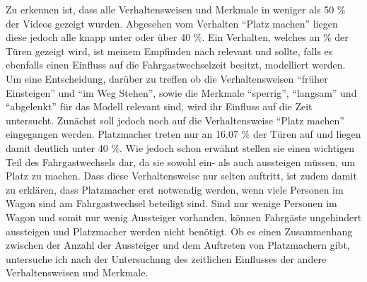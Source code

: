 Zu erkennen ist, dass alle Verhaltensweisen und Merkmale in weniger als 50 \% der Videos gezeigt wurden. Abgesehen vom Verhalten "`Platz machen"' liegen diese jedoch alle knapp unter oder über 40 \%. Ein Verhalten, welches an  \% der Türen gezeigt wird, ist meinem Empfinden nach relevant und sollte, falls es ebenfalls einen Einfluss auf die Fahrgastwechselzeit besitzt, modelliert werden. Um eine Entscheidung, darüber zu treffen ob die Verhaltensweisen "`früher Einsteigen"' und "`im Weg Stehen"', sowie die Merkmale "`sperrig"', "`langsam"' und "`abgelenkt"' für das Modell relevant sind, wird ihr Einfluss auf die Zeit untersucht. Zunächst soll jedoch noch auf die Verhaltensweise "`Platz machen"' eingegangen werden. Platzmacher treten nur an 16.07 \% der Türen auf und liegen damit deutlich unter 40 \%. Wie jedoch schon erwähnt stellen sie einen wichtigen Teil des Fahrgastwechsels dar, da sie sowohl ein- als auch aussteigen müssen, um Platz zu machen. Dass diese Verhaltensweise nur selten auftritt, ist zudem damit zu erklären, dass Platzmacher erst notwendig werden, wenn viele Personen im Wagon sind \bzw am Fahrgastwechsel beteiligt sind. Sind nur wenige Personen im Wagon und somit nur wenig Aussteiger vorhanden, können Fahrgäste ungehindert aussteigen und Platzmacher werden nicht benötigt. Ob es einen Zusammenhang zwischen der Anzahl der Aussteiger und dem Auftreten von Platzmachern gibt, untersuche ich nach der Untersuchung des zeitlichen Einflusses der andere Verhaltensweisen und Merkmale.

